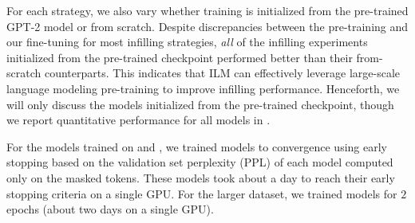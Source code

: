 For each strategy, we also vary whether training is initialized from the pre-trained GPT-2 model or from scratch.
Despite discrepancies between the pre-training and our fine-tuning for most infilling strategies, 
\emph{all} of the infilling experiments initialized from the pre-trained checkpoint performed better than their from-scratch counterparts.
This indicates that ILM can effectively leverage large-scale language modeling pre-training to improve infilling performance. 
Henceforth, we will only discuss the models initialized from the pre-trained checkpoint, though we report quantitative performance for all models in .

For the models trained on \stories{} and \abstracts{}, we trained models to convergence using early stopping based on the validation set perplexity (PPL) of each model computed only on the masked tokens. 
These models took about a day to reach their early stopping criteria on a single GPU. 
For the larger \lyrics{} dataset, we trained models for $2$ epochs (about two days on a single GPU). 